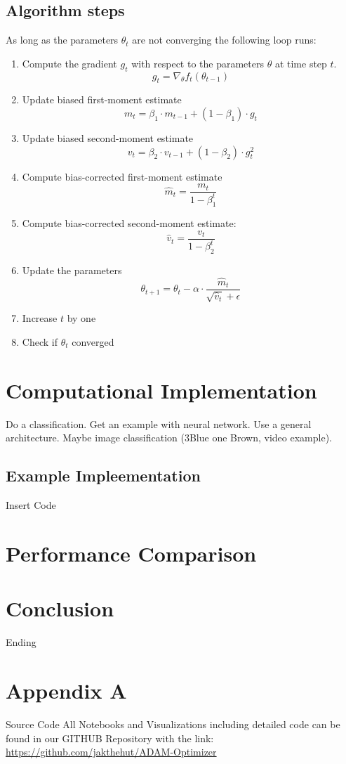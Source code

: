 \documentclass[journal]{IEEEtran}
\begin{document}
\subsection{Algorithm steps}
As long as the parameters $\theta_t$ are not converging the following loop runs:
\begin{enumerate}
    \item Compute the gradient \(g_t\) with respect to the parameters \(\theta\) at time step \(t\).\\
    $$g_t= \nabla_{\theta} f_t(\theta_{t-1})$$
    \item Update biased first-moment estimate
    $$m_t = \beta_1 \cdot m_{t-1} + (1 - \beta_1) \cdot g_t$$
    \item Update biased second-moment estimate
    $$v_t = \beta_2 \cdot v_{t-1} + (1 - \beta_2) \cdot g_t^2$$
    \item Compute bias-corrected first-moment estimate
    $$\hat{m}_t = \frac{m_t}{1 - \beta_1^t}$$
    \item Compute bias-corrected second-moment estimate: 
    $$\hat{v}_t = \frac{v_t}{1 - \beta_2^t}$$
    \item Update the parameters
    $$\theta_{t+1} = \theta_t - \alpha \cdot \frac{\hat{m}_t}{\sqrt{\hat{v}_t} + \epsilon}$$
    \item Increase $t$ by one
    \item Check if $\theta_t$ converged
\end{enumerate}




\section{Computational Implementation}
Do a classification.  
Get an example with neural network. Use a general architecture. Maybe image classification (3Blue one Brown, video example).
\subsection{Example Impleementation}
Insert Code

\section{Performance Comparison}

 
\section{Conclusion}
Ending




\onecolumn
\newpage
\pagestyle{fancy}


\section{Appendix A}
\centering Source Code
All Notebooks and Visualizations including detailed code can be found in our GITHUB Repository with the link: \href{https://github.com/jakthehut/ADAM-Optimizer}{https://github.com/jakthehut/ADAM-Optimizer}
\end{document}
